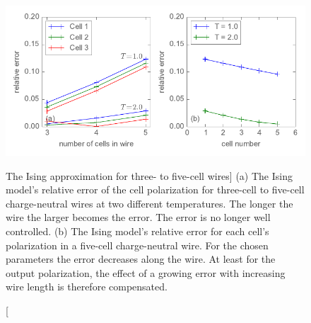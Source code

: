 \begin{figure}
  \center
  \includegraphics{ising_approximation3}
  \caption
  [The Ising approximation for three- to five-cell wires]
  {
  \label{fig:ising_approximation3}
  (a) The Ising model's relative error of the cell polarization for three-cell
  to five-cell charge-neutral wires at two different temperatures. The longer
  the wire the larger becomes the error. The error is no longer well controlled.
  (b) The Ising model's relative error for each cell's polarization in a
  five-cell charge-neutral wire. For the chosen parameters the error decreases
  along the wire. At least for the output polarization, the effect of a growing
  error with increasing wire length is therefore compensated.
  }
\end{figure}
%

